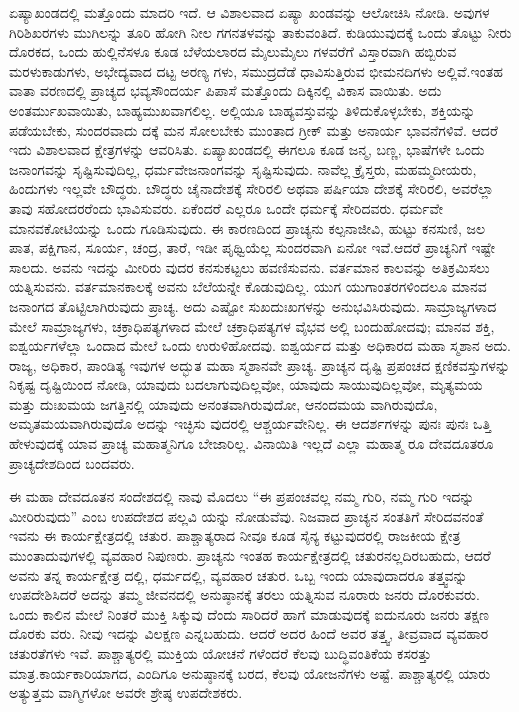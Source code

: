 ಏಷ್ಯಾಖಂಡದಲ್ಲಿ ಮತ್ತೊಂದು ಮಾದರಿ ಇದೆ. ಆ ವಿಶಾಲವಾದ ಏಷ್ಯಾ ಖಂಡವನ್ನು ಆಲೋಚಿಸಿ ನೋಡಿ. ಅವುಗಳ ಗಿರಿಶಿಖರಗಳು ಮುಗಿಲನ್ನು ತೂರಿ ಹೋಗಿ ನೀಲ ಗಗನತಳವನ್ನು ತಾಕುವಂತಿದೆ. ಕುಡಿಯುವುದಕ್ಕೆ ಒಂದು ತೊಟ್ಟು ನೀರು ದೊರಕದ, ಒಂದು ಹುಲ್ಲಿನೆಸಳೂ ಕೂಡ ಬೆಳೆಯಲಾರದ ಮೈಲುಮೈಲು ಗಳವರೆಗೆ ವಿಸ್ತಾರವಾಗಿ ಹಬ್ಬಿರುವ ಮರಳುಕಾಡುಗಳು, ಅಭೇದ್ಯವಾದ ದಟ್ಟ ಅರಣ್ಯ ಗಳು, ಸಮುದ್ರದೆಡೆ ಧಾವಿಸುತ್ತಿರುವ ಭೀಮನದಿಗಳು ಅಲ್ಲಿವೆ.ಇಂತಹ ವಾತಾ ವರಣದಲ್ಲಿ ಪ್ರಾಚ್ಯದ ಭವ್ಯಸೌಂದರ್ಯ ಪಿಪಾಸೆ ಮತ್ತೊಂದು ದಿಕ್ಕಿನಲ್ಲಿ ವಿಕಾಸ ವಾಯಿತು. ಅದು ಅಂತರ್ಮುಖವಾಯಿತು, ಬಾಹ್ಯಮುಖವಾಗಲಿಲ್ಲ. ಅಲ್ಲಿಯೂ ಬಾಹ್ಯವಸ್ತುವನ್ನು ತಿಳಿದುಕೊಳ್ಳಬೇಕು, ಶಕ್ತಿಯನ್ನು ಪಡೆಯಬೇಕು, ಸುಂದರವಾದು ದಕ್ಕೆ ಮನ ಸೋಲಬೇಕು ಮುಂತಾದ ಗ್ರೀಕ್​ ಮತ್ತು ಅನಾರ್ಯ ಭಾವನೆಗಳಿವೆ. ಆದರೆ ಇದು ವಿಶಾಲವಾದ ಕ್ಷೇತ್ರಗಳನ್ನು ಆವರಿಸಿತು. ಏಷ್ಯಾಖಂಡದಲ್ಲಿ ಈಗಲೂ ಕೂಡ ಜನ್ಮ, ಬಣ್ಣ, ಭಾಷೆಗಳೇ ಒಂದು ಜನಾಂಗವನ್ನು ಸೃಷ್ಟಿಸುವುದಿಲ್ಲ, ಧರ್ಮವೇಜನಾಂಗವನ್ನು ಸೃಷ್ಟಿಸುವುದು. ನಾವೆಲ್ಲ ಕ್ರೈಸ್ತರು, ಮಹಮ್ಮದೀಯರು, ಹಿಂದುಗಳು ಇಲ್ಲವೇ ಬೌದ್ಧರು. ಬೌದ್ಧರು ಚೈನಾದೇಶಕ್ಕೆ ಸೇರಿರಲಿ ಅಥವಾ ಪರ್ಷಿಯಾ ದೇಶಕ್ಕೆ ಸೇರಿರಲಿ, ಅವರೆಲ್ಲಾ ತಾವು ಸಹೋದರರೆಂದು ಭಾವಿಸುವರು. ಏಕೆಂದರೆ ಎಲ್ಲರೂ ಒಂದೇ ಧರ್ಮಕ್ಕೆ ಸೇರಿದವರು. ಧರ್ಮವೇ ಮಾನವಕೋಟಿಯನ್ನು ಒಂದು ಗೂಡಿಸುವುದು. ಈ ಕಾರಣದಿಂದ ಪ್ರಾಚ್ಯನು ಕಲ್ಪನಾಜೀವಿ, ಹುಟ್ಟು ಕನಸುಣಿ, ಜಲ ಪಾತ, ಪಕ್ಷಿಗಾನ, ಸೂರ್ಯ, ಚಂದ್ರ, ತಾರೆ, ಇಡೀ ಪೃಥ್ವಿಯೆಲ್ಲ ಸುಂದರವಾಗಿ ಏನೋ ಇವೆ.ಆದರೆ ಪ್ರಾಚ್ಯನಿಗೆ ಇಷ್ಟೇ ಸಾಲದು. ಅವನು ಇದನ್ನು ಮೀರಿರು ವುದರ ಕನಸುಕಟ್ಟಲು ಹವಣಿಸುವನು. ವರ್ತಮಾನ ಕಾಲವನ್ನು ಅತಿಕ್ರಮಿಸಲು ಯತ್ನಿಸುವನು. ವರ್ತಮಾನಕಾಲಕ್ಕೆ ಅವನು ಬೆಲೆಯನ್ನೇ ಕೊಡುವುದಿಲ್ಲ. ಯುಗ ಯುಗಾಂತರಗಳಿಂದಲೂ ಮಾನವ ಜನಾಂಗದ ತೊಟ್ಟಿಲಾಗಿರುವುದು ಪ್ರಾಚ್ಯ. ಅದು ಎಷ್ಟೋ ಸುಖದುಃಖಗಳನ್ನು ಅನುಭವಿಸಿರುವುದು. ಸಾಮ್ರಾಜ್ಯಗಳಾದ ಮೇಲೆ ಸಾಮ್ರಾಜ್ಯಗಳು, ಚಕ್ರಾಧಿಪತ್ಯಗಳಾದ ಮೇಲೆ ಚಕ್ರಾಧಿಪತ್ಯಗಳ ವೈಭವ ಅಲ್ಲಿ ಬಂದುಹೋದವು; ಮಾನವ ಶಕ್ತಿ, ಐಶ್ವರ್ಯಗಳೆಲ್ಲಾ ಒಂದಾದ ಮೇಲೆ ಒಂದು ಉರುಳಿಹೋದವು. ಐಶ್ವರ್ಯದ ಮತ್ತು ಅಧಿಕಾರದ ಮಹಾ ಸ್ಮಶಾನ ಅದು. ರಾಜ್ಯ, ಅಧಿಕಾರ, ಪಾಂಡಿತ್ಯ ಇವುಗಳ ಅದ್ಭುತ ಮಹಾ ಸ್ಮಶಾನವೇ ಪ್ರಾಚ್ಯ. ಪ್ರಾಚ್ಯನ ದೃಷ್ಟಿ ಪ್ರಪಂಚದ ಕ್ಷಣಿಕವಸ್ತುಗಳನ್ನು ನಿಕೃಷ್ಟ ದೃಷ್ಟಿಯಿಂದ ನೋಡಿ, ಯಾವುದು ಬದಲಾಗುವುದಿಲ್ಲವೋ, ಯಾವುದು ಸಾಯುವುದಿಲ್ಲವೋ, ಮೃತ್ಯಮಯ ಮತ್ತು ದುಃಖಮಯ ಜಗತ್ತಿನಲ್ಲಿ ಯಾವುದು ಅನಂತವಾಗಿರುವುದೋ, ಆನಂದಮಯ ವಾಗಿರುವುದೊ, ಅಮೃತಮಯವಾಗಿರುವುದೊ ಅದನ್ನು ಇಚ್ಛಿಸು ವುದರಲ್ಲಿ ಆಶ್ಚರ್ಯವೇನಿಲ್ಲ. ಈ ಆದರ್ಶಗಳನ್ನು ಪುನಃ ಪುನಃ ಒತ್ತಿ ಹೇಳುವುದಕ್ಕೆ ಯಾವ ಪ್ರಾಚ್ಯ ಮಹಾತ್ಮನಿಗೂ ಬೇಜಾರಿಲ್ಲ. ವಿನಾಯಿತಿ ಇಲ್ಲದೆ ಎಲ್ಲಾ ಮಹಾತ್ಮ ರೂ ದೇವದೂತರೂ ಪ್ರಾಚ್ಯದೇಶದಿಂದ ಬಂದವರು.

ಈ ಮಹಾ ದೇವದೂತನ ಸಂದೇಶದಲ್ಲಿ ನಾವು ಮೊದಲು “ಈ ಪ್ರಪಂಚವಲ್ಲ ನಮ್ಮ ಗುರಿ, ನಮ್ಮ ಗುರಿ ಇದನ್ನು ಮೀರಿರುವುದು” ಎಂಬ ಉಪದೇಶದ ಪಲ್ಲವಿ ಯನ್ನು ನೋಡುವೆವು. ನಿಜವಾದ ಪ್ರಾಚ್ಯನ ಸಂತತಿಗೆ ಸೇರಿದವನಂತೆ ಇವನು ಈ ಕಾರ್ಯಕ್ಷೇತ್ರದಲ್ಲಿ ಚತುರ. ಪಾಶ್ಚಾತ್ಯರಾದ ನೀವೂ ಕೂಡ ಸೈನ್ಯ ಕಟ್ಟುವುದರಲ್ಲಿ ರಾಜಕೀಯ ಕ್ಷೇತ್ರ ಮುಂತಾದುವುಗಳಲ್ಲಿ ವ್ಯವಹಾರ ನಿಪುಣರು. ಪ್ರಾಚ್ಯನು ಇಂತಹ ಕಾರ್ಯಕ್ಷೇತ್ರದಲ್ಲಿ ಚತುರನಲ್ಲದಿರಬಹುದು, ಆದರೆ ಅವನು ತನ್ನ ಕಾರ್ಯಕ್ಷೇತ್ರ ದಲ್ಲಿ, ಧರ್ಮದಲ್ಲಿ, ವ್ಯವಹಾರ ಚತುರ. ಒಬ್ಬ ಇಂದು ಯಾವುದಾದರೂ ತತ್ತ್ವವನ್ನು ಉಪದೇಶಿಸಿದರೆ ಅದನ್ನು ತಮ್ಮ ಜೀವನದಲ್ಲಿ ಅನುಷ್ಠಾನಕ್ಕೆ ತರಲು ಯತ್ನಿಸುವ ನೂರಾರು ಜನರು ದೊರಕುವರು. ಒಂದು ಕಾಲಿನ ಮೇಲೆ ನಿಂತರೆ ಮುಕ್ತಿ ಸಿಕ್ಕುವು ದೆಂದು ಸಾರಿದರೆ ಹಾಗೆ ಮಾಡುವುದಕ್ಕೆ ಐದುನೂರು ಜನರು ತಕ್ಷಣ ದೊರಕು ವರು. ನೀವು ಇದನ್ನು ವಿಲಕ್ಷಣ ಎನ್ನಬಹುದು. ಆದರೆ ಅದರ ಹಿಂದೆ ಅವರ ತತ್ತ್ವ, ತೀವ್ರವಾದ ವ್ಯವಹಾರ ಚತುರತೆಗಳು ಇವೆ. ಪಾಶ್ಚಾತ್ಯರಲ್ಲಿ ಮುಕ್ತಿಯ ಯೋಚನೆ ಗಳೆಂದರೆ ಕೆಲವು ಬುದ್ಧಿವಂತಿಕೆಯ ಕಸರತ್ತು ಮಾತ್ರ.ಕಾರ್ಯಕಾರಿಯಾಗದ, ಎಂದಿಗೂ ಅನುಷ್ಠಾನಕ್ಕೆ ಬರದ, ಕೆಲವು ಯೋಜನೆಗಳು ಅಷ್ಟೆ. ಪಾಶ್ಚಾತ್ಯರಲ್ಲಿ ಯಾರು ಅತ್ಯುತ್ತಮ ವಾಗ್ಮಿಗಳೋ ಅವರೇ ಶ್ರೇಷ್ಠ ಉಪದೇಶಕರು.


